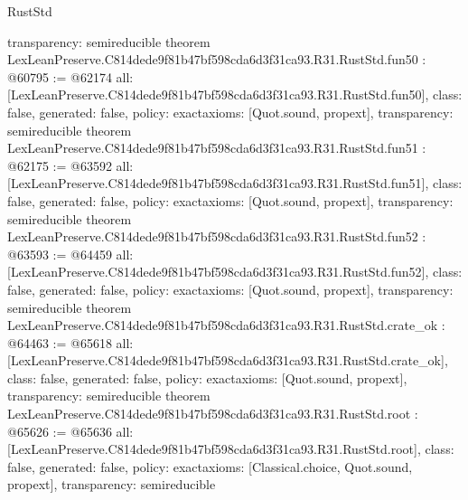 \begin{lexlean}{RustStd}
\begin{coremodule}
{  transparency: semireducible
}
theorem LexLeanPreserve.C814dede9f81b47bf598cda6d3f31ca93.R31.RustStd.fun50 : @60795 := @62174 {
  all: [LexLeanPreserve.C814dede9f81b47bf598cda6d3f31ca93.R31.RustStd.fun50],
  class: false,
  generated: false,
  policy: exact{axioms: [Quot.sound, propext]},
  transparency: semireducible
}
theorem LexLeanPreserve.C814dede9f81b47bf598cda6d3f31ca93.R31.RustStd.fun51 : @62175 := @63592 {
  all: [LexLeanPreserve.C814dede9f81b47bf598cda6d3f31ca93.R31.RustStd.fun51],
  class: false,
  generated: false,
  policy: exact{axioms: [Quot.sound, propext]},
  transparency: semireducible
}
theorem LexLeanPreserve.C814dede9f81b47bf598cda6d3f31ca93.R31.RustStd.fun52 : @63593 := @64459 {
  all: [LexLeanPreserve.C814dede9f81b47bf598cda6d3f31ca93.R31.RustStd.fun52],
  class: false,
  generated: false,
  policy: exact{axioms: [Quot.sound, propext]},
  transparency: semireducible
}
theorem LexLeanPreserve.C814dede9f81b47bf598cda6d3f31ca93.R31.RustStd.crate_ok : @64463 := @65618 {
  all: [LexLeanPreserve.C814dede9f81b47bf598cda6d3f31ca93.R31.RustStd.crate_ok],
  class: false,
  generated: false,
  policy: exact{axioms: [Quot.sound, propext]},
  transparency: semireducible
}
theorem LexLeanPreserve.C814dede9f81b47bf598cda6d3f31ca93.R31.RustStd.root : @65626 := @65636 {
  all: [LexLeanPreserve.C814dede9f81b47bf598cda6d3f31ca93.R31.RustStd.root],
  class: false,
  generated: false,
  policy: exact{axioms: [Classical.choice, Quot.sound, propext]},
  transparency: semireducible
}


\end{coremodule}
\end{lexlean}
